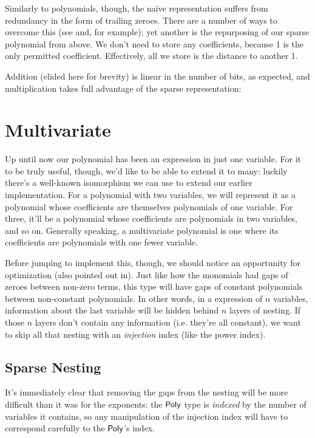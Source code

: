 \documentclass[draft, twocolumn]{article}
\theoremstyle{definition}
\begin{document}
Similarly to polynomials, though, the naïve representation suffers from
redundancy in the form of trailing zeroes. There are a number of ways to
overcome this (see\cite{meshveliani_binary-4_2018}
and\cite{escardo_libraries_2018}, for example); yet another is the repurposing
of our sparse polynomial from above.
We don't need to store any coefficients, because 1 is the only permitted
coefficient. Effectively, all we store is the distance to another 1.

Addition (elided here for brevity) is linear in the number of bits, as expected,
and multiplication takes full advantage of the sparse representation:
\section{Multivariate}
Up until now our polynomial has been an expression in just one variable. For it
to be truly useful, though, we'd like to be able to extend it to many: luckily
there's a well-known isomorphism we can use to extend our earlier
implementation. For a polynomial with two variables, we will represent it as a
polynomial whose coefficients are themselves polynomials of one variable. For
three, it'll be a polynomial whose coefficients are polynomials in two
variables, and so on. Generally speaking, a multivariate polynomial is one where
its coefficients are polynomials with one fewer
variable\cite{cheng_functional_2018}.

Before jumping to implement this, though, we should notice an opportunity for
optimization (also pointed out in\cite{hutchison_proving_2005}). Just like how
the monomials had gaps of zeroes between non-zero terms, this type will have
gaps of constant polynomials between non-constant polynomials. In other words,
in a expression of \(n\) variables, information about the last variable will be
hidden behind \(n\) layers of nesting. If those \(n\) layers don't contain any
information (i.e. they're all constant), we want to skip all that nesting with
an \emph{injection} index (like the power index).
\subsection{Sparse Nesting}
It's immediately clear that removing the gaps from the nesting will be more
difficult than it was for the exponents: the \(\AgdaDatatype{Poly}\) type is
\emph{indexed} by the number of variables it contains, so any manipulation of
the injection index will have to correspond carefully to the
\(\AgdaDatatype{Poly}\)'s index.
\end{document}

